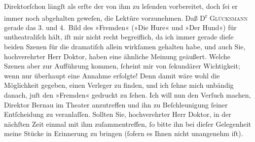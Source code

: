 \begin{ledgroupsized}[t]{13cm}
                  Direktorſchon längſt als erſte der von ihm zu leſenden
               vorbereitet, doch ſei er immer noch abgehalten geweſen, die Lektüre vorzunehmen.\pend
           \pstart
           Daß D\textsuperscript{r}{ }\textsc{Glücksmann} gerade das 3. und 4. Bild des »Fremden«
                  (»Die Hure« und »Der Hund«) für untheatraliſch
               hält, iſt mir nicht recht begreiflich, da ich immer gerade dieſe beiden Szenen für
               die dramatiſch allein wirkſamen gehalten habe, und auch Sie, hochverehrter Herr
               Doktor, haben eine ähnliche Meinung geäußert.\pend
           \pstart
           Welche Szenen aber zur Aufführung kommen, ſcheint mir von ſekundärer Wichtigkeit;
               wenn nur überhaupt eine Annahme erfolgte! Denn damit wäre wohl die Möglichkeit
               gegeben, einen Verleger zu finden, und ich ſehne mich unbändig danach, juſt den »Fremden« gedruckt zu ſehen.\pend
           \pstart
           Ich will nun den Verſuch machen, Direktor Bernau im Theater anzu{\pb}treffen
               und ihn zu Beſchleunigung ſeiner Entſcheidung zu veranlaſſen. Sollten Sie,
               hochverehrter Herr Doktor, in der nächſten Zeit einmal mit ihm zuſammentreffen, ſo
               bitte ihn bei dieſer Gelegenheit meine Stücke in Erinnerung zu bringen (ſofern es
               Ihnen nicht unangenehm iſt).\pend

\end{ledgroupsized}
